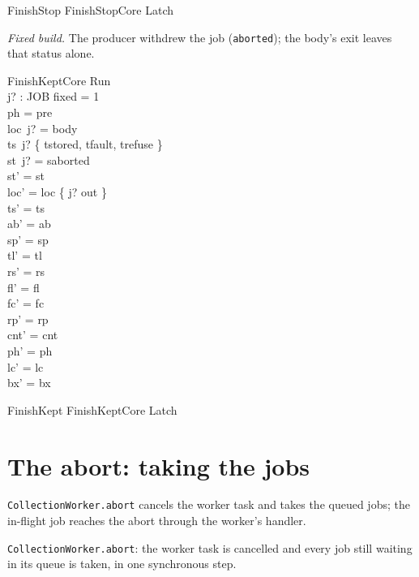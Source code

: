 \documentclass[a4paper,10pt,fleqn]{article}
\newcommand{\field}[1]{\texttt{#1}}
\begin{document}
\begin{zed}
FinishStop  FinishStopCore \land Latch
\end{zed}

\emph{Fixed build.} The producer withdrew the job (\field{aborted}); the body's
exit leaves that status alone.

\begin{schema}{FinishKeptCore}
\Delta Run \\ j? : JOB
\where
fixed = 1 \\
ph = pre \\
loc~j? = body \\
ts~j? \in \{ tstored, tfault, trefuse \} \\
st~j? = saborted \\
st' = st \\
loc' = loc \oplus \{ j? \mapsto out \} \\
ts' = ts \\
ab' = ab \\
sp' = sp \\
tl' = tl \\
rs' = rs \\
fl' = fl \\
fc' = fc \\
rp' = rp \\
cnt' = cnt \\
ph' = ph \\
lc' = lc \\
bx' = bx
\end{schema}

\begin{zed}
FinishKept  FinishKeptCore \land Latch
\end{zed}


\section{The abort: taking the jobs}
\label{sec:take}

\field{CollectionWorker.abort} cancels the worker task and takes the queued
jobs; the in-flight job reaches the abort through the worker's handler.

\field{CollectionWorker.abort}: the worker task is cancelled and every job still
waiting in its queue is taken, in one synchronous step.
\end{document}

